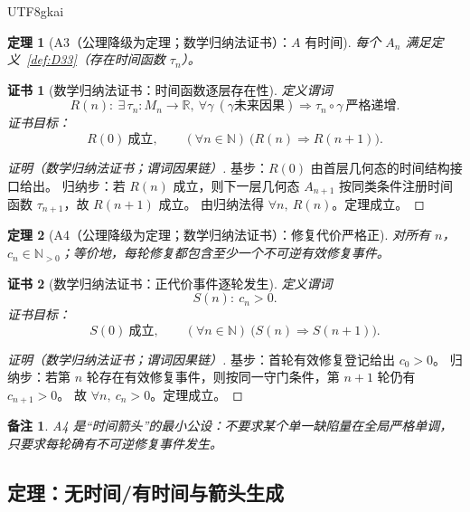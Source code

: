 \documentclass[12pt]{article}
\newtheorem{theorem}{定理}[section]
\newtheorem{remark}{备注}[section]
\newtheorem{Certificate}{证书}[section]
\begin{document}
\begin{CJK*}{UTF8}{gkai}
\begin{theorem}[A3（公理降级为定理；数学归纳法证书）：$A$ 有时间]
\label{thm:A3-ba3}
每个 $A_n$ 满足定义~\ref{def:D33}（存在时间函数 $\tau_n$）。
\end{theorem}

\begin{Certificate}[数学归纳法证书：时间函数逐层存在性]
\label{cert:A3-ba3}
定义谓词
\[
R(n):\ \exists\,\tau_n:M_n\to\mathbb R,\ \forall\gamma\ (\gamma\text{未来因果})\Rightarrow \tau_n\circ\gamma\ \text{严格递增}.
\]
证书目标：
\[
R(0)\ \text{成立},\qquad (\forall n\in\mathbb N)\ \bigl(R(n)\Rightarrow R(n+1)\bigr).
\]
\end{Certificate}

\begin{proof}[证明（数学归纳法证书；谓词因果链）]
基步：$R(0)$ 由首层几何态的时间结构接口给出。
归纳步：若 $R(n)$ 成立，则下一层几何态 $A_{n+1}$ 按同类条件注册时间函数 $\tau_{n+1}$，故 $R(n+1)$ 成立。
由归纳法得 $\forall n,\ R(n)$。定理成立。
\end{proof}

\begin{theorem}[A4（公理降级为定理；数学归纳法证书）：修复代价严格正]
\label{thm:A4-ba3}
对所有 $n$，$c_n\in\mathbb N_{>0}$；等价地，每轮修复都包含至少一个不可逆有效修复事件。
\end{theorem}

\begin{Certificate}[数学归纳法证书：正代价事件逐轮发生]
\label{cert:A4-ba3}
定义谓词
\[
S(n):\ c_n>0.
\]
证书目标：
\[
S(0)\ \text{成立},\qquad (\forall n\in\mathbb N)\ \bigl(S(n)\Rightarrow S(n+1)\bigr).
\]
\end{Certificate}

\begin{proof}[证明（数学归纳法证书；谓词因果链）]
基步：首轮有效修复登记给出 $c_0>0$。
归纳步：若第 $n$ 轮存在有效修复事件，则按同一守门条件，第 $n+1$ 轮仍有 $c_{n+1}>0$。
故 $\forall n,\ c_n>0$。定理成立。
\end{proof}

\begin{remark}
A4 是“时间箭头”的最小公设：不要求某个单一缺陷量在全局严格单调，只要求每轮确有不可逆修复事件发生。
\end{remark}

\subsection{定理：无时间/有时间与箭头生成}


\end{CJK*}
\end{document}
